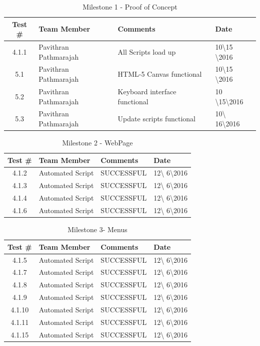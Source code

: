 \documentclass{article}
\begin{document}
\begin{table}[H]
\caption{Milestone 1 - Proof of Concept}
	\begin{tabularx}{\textwidth}{| c | l | X | l |}
	\toprule
	Test \#& Team Member &Comments &Date\\
	\midrule
	4.1.1 & Pavithran Pathmarajah & All Scripts load up & 10\textbackslash15
	\textbackslash 2016\\
	5.1 & Pavithran Pathmarajah & HTML-5 Canvas functional & 10\textbackslash15
	\textbackslash2016\\
	5.2 & Pavithran Pathmarajah & Keyboard interface functional & 10
	\textbackslash15\textbackslash2016\\
	5.3 & Pavithran Pathmarajah & Update scripts functional & 10\textbackslash
	16\textbackslash2016\\
	\bottomrule
	\end{tabularx}
\end{table}

\begin{table}[H]
\caption{Milestone 2 - WebPage}
	\begin{tabularx}{\textwidth}{| c | l | X | l |}
	\toprule
	Test \#& Team Member &Comments &Date\\
	\midrule
	4.1.2 & Automated Script   & SUCCESSFUL & 12\textbackslash
	6\textbackslash2016\\
	4.1.3 & Automated Script  & SUCCESSFUL & 12\textbackslash
	6\textbackslash2016\\
	4.1.4 & Automated Script  & SUCCESSFUL & 12\textbackslash
	6\textbackslash2016\\
	4.1.6 & Automated Script  & SUCCESSFUL & 12\textbackslash
	6\textbackslash2016\\
	\bottomrule
	\end{tabularx}
\end{table}

\begin{table}[H]
\caption{Milestone 3- Menus}
	\begin{tabularx}{\textwidth}{| c | l | X | l |}
	\toprule
	Test \#& Team Member &Comments &Date\\
	\midrule
	4.1.5 & Automated Script  & SUCCESSFUL & 12\textbackslash
	6\textbackslash2016\\
	4.1.7 & Automated Script  & SUCCESSFUL & 12\textbackslash
	6\textbackslash2016\\
	4.1.8 & Automated Script  & SUCCESSFUL & 12\textbackslash
	6\textbackslash2016\\
	4.1.9 & Automated Script  & SUCCESSFUL & 12\textbackslash
	6\textbackslash2016\\
	4.1.10 & Automated Script  & SUCCESSFUL & 12\textbackslash
	6\textbackslash2016\\
	4.1.11 & Automated Script  & SUCCESSFUL & 12\textbackslash
	6\textbackslash2016\\
	4.1.15 & Automated Script  & SUCCESSFUL & 12\textbackslash
	6\textbackslash2016\\
	\bottomrule
	\end{tabularx}
\end{table}
\end{document}
